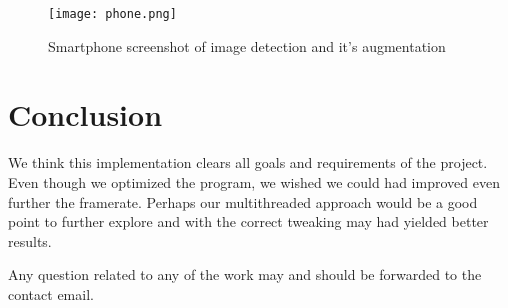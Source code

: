 \documentclass[DIV=calc, paper=a4, fontsize=11pt, twocolumn]{scrartcl}   %
\begin{document}
\begin{figure}[!h]
    \centering
    \texttt{[image: phone.png]}
    \caption{Smartphone screenshot of image detection and it's augmentation}
    \label{fig:phone}
\end{figure}

\section*{Conclusion}
We think this implementation clears all goals and requirements of the project. Even though we optimized the program, we wished we could had improved even further the framerate. Perhaps our multithreaded approach would be a good point to further explore and with the correct tweaking may had yielded better results.

Any question related to any of the work may and should be forwarded to the contact email.
\end{document}
